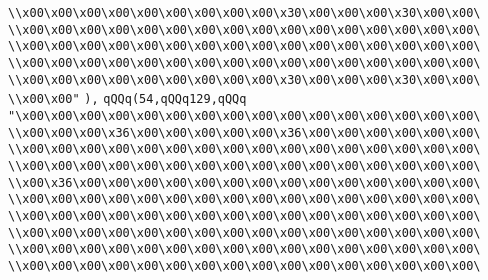 \verb|\\x00\x00\x00\x00\x00\x00\x00\x00\x00\x30\x00\x00\x00\x30\x00\x00\|\newline
\verb|\\x00\x00\x00\x00\x00\x00\x00\x00\x00\x00\x00\x00\x00\x00\x00\x00\|\newline
\verb|\\x00\x00\x00\x00\x00\x00\x00\x00\x00\x00\x00\x00\x00\x00\x00\x00\|\newline
\verb|\\x00\x00\x00\x00\x00\x00\x00\x00\x00\x00\x00\x00\x00\x00\x00\x00\|\newline
\verb|\\x00\x00\x00\x00\x00\x00\x00\x00\x00\x30\x00\x00\x00\x30\x00\x00\|\newline
\verb|\\x00\x00"|\newline
\verb|),|\newline
\verb|qQQq(54,qQQq129,qQQq|\newline
\verb|"\x00\x00\x00\x00\x00\x00\x00\x00\x00\x00\x00\x00\x00\x00\x00\x00\|\newline
\verb|\\x00\x00\x00\x36\x00\x00\x00\x00\x00\x36\x00\x00\x00\x00\x00\x00\|\newline
\verb|\\x00\x00\x00\x00\x00\x00\x00\x00\x00\x00\x00\x00\x00\x00\x00\x00\|\newline
\verb|\\x00\x00\x00\x00\x00\x00\x00\x00\x00\x00\x00\x00\x00\x00\x00\x00\|\newline
\verb|\\x00\x36\x00\x00\x00\x00\x00\x00\x00\x00\x00\x00\x00\x00\x00\x00\|\newline
\verb|\\x00\x00\x00\x00\x00\x00\x00\x00\x00\x00\x00\x00\x00\x00\x00\x00\|\newline
\verb|\\x00\x00\x00\x00\x00\x00\x00\x00\x00\x00\x00\x00\x00\x00\x00\x00\|\newline
\verb|\\x00\x00\x00\x00\x00\x00\x00\x00\x00\x00\x00\x00\x00\x00\x00\x00\|\newline
\verb|\\x00\x00\x00\x00\x00\x00\x00\x00\x00\x00\x00\x00\x00\x00\x00\x00\|\newline
\verb|\\x00\x00\x00\x00\x00\x00\x00\x00\x00\x00\x00\x00\x00\x00\x00\x00\|\newline
